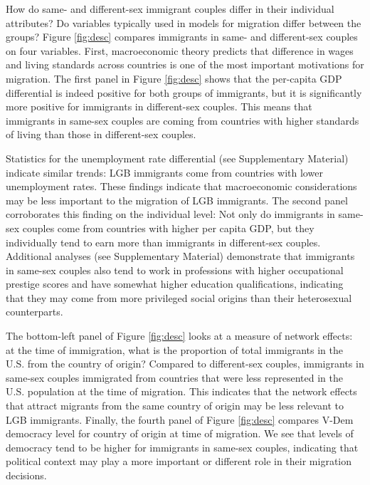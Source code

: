 \documentclass[
  11pt,
]{article}
\begin{document}
How do same- and different-sex immigrant couples differ in their individual attributes? Do variables typically used in models for migration differ between the groups? Figure \ref{fig:desc} compares immigrants in same- and different-sex couples on four variables. First, macroeconomic theory predicts that difference in wages and living standards across countries is one of the most important motivations for migration. The first panel in Figure \ref{fig:desc} shows that the per-capita GDP differential is indeed positive for both groups of immigrants, but it is significantly more positive for immigrants in different-sex couples. This means that immigrants in same-sex couples are coming from countries with higher standards of living than those in different-sex couples.

Statistics for the unemployment rate differential (see Supplementary Material) indicate similar trends: LGB immigrants come from countries with lower unemployment rates. These findings indicate that macroeconomic considerations may be less important to the migration of LGB immigrants. The second panel corroborates this finding on the individual level: Not only do immigrants in same-sex couples come from countries with higher per capita GDP, but they individually tend to earn more than immigrants in different-sex couples. Additional analyses (see Supplementary Material) demonstrate that immigrants in same-sex couples also tend to work in professions with higher occupational prestige scores and have somewhat higher education qualifications, indicating that they may come from more privileged social origins than their heterosexual counterparts.

The bottom-left panel of Figure \ref{fig:desc} looks at a measure of network effects: at the time of immigration, what is the proportion of total immigrants in the U.S. from the country of origin? Compared to different-sex couples, immigrants in same-sex couples immigrated from countries that were less represented in the U.S. population at the time of migration. This indicates that the network effects that attract migrants from the same country of origin may be less relevant to LGB immigrants. Finally, the fourth panel of Figure \ref{fig:desc} compares V-Dem democracy level for country of origin at time of migration. We see that levels of democracy tend to be higher for immigrants in same-sex couples, indicating that political context may play a more important or different role in their migration decisions.
\end{document}
